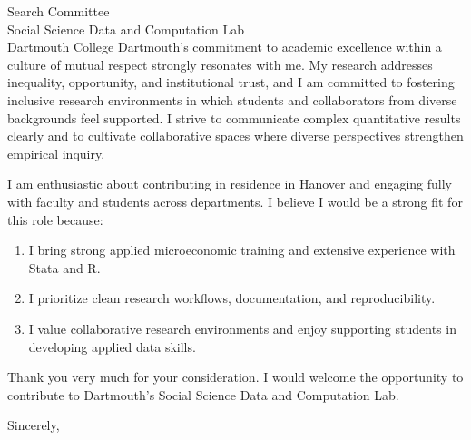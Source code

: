 \documentclass[11pt,letterpaper]{letter}
\begin{document}
\begin{letter}{
Search Committee \\
Social Science Data and Computation Lab \\
Dartmouth College
}
Dartmouth’s commitment to academic excellence within a culture of mutual respect strongly resonates with me. My research addresses inequality, opportunity, and institutional trust, and I am committed to fostering inclusive research environments in which students and collaborators from diverse backgrounds feel supported. I strive to communicate complex quantitative results clearly and to cultivate collaborative spaces where diverse perspectives strengthen empirical inquiry.

I am enthusiastic about contributing in residence in Hanover and engaging fully with faculty and students across departments. I believe I would be a strong fit for this role because:

\begin{enumerate}
    \item I bring strong applied microeconomic training and extensive experience with Stata and R.
    \item I prioritize clean research workflows, documentation, and reproducibility.
    \item I value collaborative research environments and enjoy supporting students in developing applied data skills.
\end{enumerate}

Thank you very much for your consideration. I would welcome the opportunity to contribute to Dartmouth’s Social Science Data and Computation Lab.

\closing{Sincerely,}

\end{letter}
\end{document}
